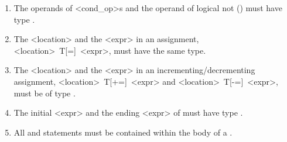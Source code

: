 \begin{enumerate}
\item The operands of {\bnf <cond_op>}s and the operand of logical not
      (\kw{!}) must have type .
\item The {\bnf <location>} and the {\bnf <expr>} in an assignment, 
{\bnf <location>~T[=]~<expr>}, must have the same type.
\item The {\bnf <location>} and the {\bnf <expr>} in an
incrementing/decrementing assignment,
{\bnf <location>~T[+=]~<expr>} and {\bnf <location>~T[-=]~<expr>}, must be of type .
\item The initial {\bnf <expr>} and the ending {\bnf <expr>} of
   must have type .
\item All  and  statements must be contained within 
      the body of a .
\end{enumerate}
